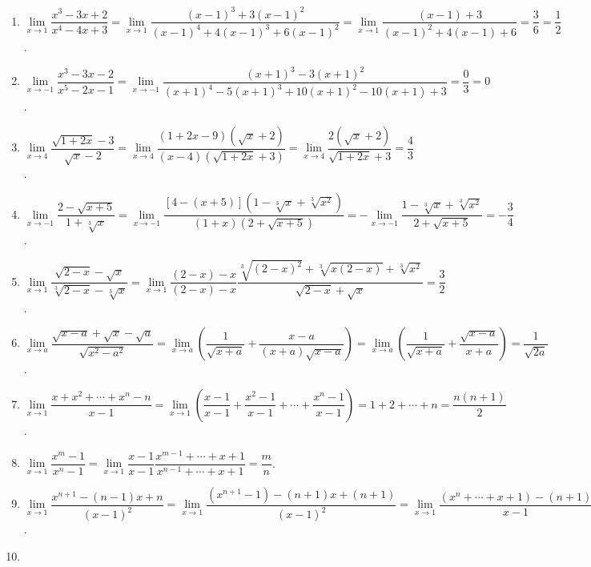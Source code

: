 \documentclass[UTF8,a4paper,20pt]{article}
\begin{document}
\begin{enumerate}[1.]
\begin{enumerate}[(1)]
	\item $\lim\limits_{x\to 1} \dfrac{x^3-3x+2}{x^4-4x+3}=\lim\limits_{x\to 1} \dfrac{(x-1)^3+3(x-1)^2}{(x-1)^4+4(x-1)^3+6(x-1)^2}=\lim\limits_{x\to 1} \dfrac{(x-1)+3}{(x-1)^2+4(x-1)+6}=\dfrac{3}{6}=\dfrac{1}{2}$.
	\item $\lim\limits_{x\to -1} \dfrac{x^3-3x-2}{x^5-2x-1}=\lim\limits_{x\to -1} \dfrac{(x+1)^3-3(x+1)^2}{(x+1)^4-5(x+1)^3+10(x+1)^2-10(x+1)+3}=\dfrac{0}{3}=0$.
	\item $\lim\limits_{x\to 4} \dfrac{\sqrt{1+2x}-3}{\sqrt{x}-2}=\lim\limits_{x\to 4} \dfrac{(1+2x-9)(\sqrt{x}+2)}{(x-4)(\sqrt{1+2x}+3)}=\lim\limits_{x\to 4} \dfrac{2(\sqrt{x}+2)}{\sqrt{1+2x}+3}=\dfrac{4}{3}$.
	\item $\lim\limits_{x\to -1} \dfrac{2-\sqrt{x+5}}{1+\sqrt[3]{x}}=\lim\limits_{x\to -1} \dfrac{[4-(x+5)](1-\sqrt[3]{x}+\sqrt[3]{x^2})}{(1+x)(2+\sqrt{x+5})}=-\lim\limits_{x\to -1} \dfrac{1-\sqrt[3]{x}+\sqrt[3]{x^2}}{2+\sqrt{x+5}}= -\dfrac{3}{4}$.
	\item $\lim\limits_{x\to 1} \dfrac{\sqrt{2-x}-\sqrt{x}}{\sqrt[3]{2-x}-\sqrt[3]{x}}=\lim\limits_{x\to 1} \dfrac{(2-x)-x}{(2-x)-x}\dfrac{\sqrt[3]{(2-x)^2}+\sqrt[3]{x(2-x)}+\sqrt[3]{x^2}}{\sqrt{2-x}+\sqrt{x}}=\dfrac{3}{2}$.
	\item $\lim\limits_{x\to a} \dfrac{\sqrt{x-a}+\sqrt{x}-\sqrt{a}}{\sqrt{x^2-a^2}}=\lim\limits_{x\to a}\left(\dfrac{1}{\sqrt{x+a}}+\dfrac{x-a}{(x+a)\sqrt{x-a}}\right)=\lim\limits_{x\to a}\left(\dfrac{1}{\sqrt{x+a}}+\dfrac{\sqrt{x-a}}{x+a}\right)=\dfrac{1}{\sqrt{2a}}$.
	\item $\lim\limits_{x\to 1} \dfrac{x+x^2+\cdots+x^n-n}{x-1}=\lim\limits_{x\to 1}\left(\dfrac{x-1}{x-1}+\dfrac{x^2-1}{x-1}+\cdots+\dfrac{x^n-1}{x-1}\right)=1+2+\cdots+n=\dfrac{n(n+1)}{2}$.
	\item $\lim\limits_{x\to 1} \dfrac{x^m-1}{x^n-1}=\lim\limits_{x\to 1}\dfrac{x-1}{x-1}\dfrac{x^{m-1}+\cdots+x+1}{x^{n-1}+\cdots+x+1}=\dfrac{m}{n}$.
	\item $\lim\limits_{x\to 1} \dfrac{x^{n+1}-(n-1)x+n}{(x-1)^2}=\lim\limits_{x\to 1} \dfrac{(x^{n+1}-1)-(n+1)x+(n+1)}{(x-1)^2} =\lim\limits_{x\to 1} \dfrac{(x^n+\cdots+x+1)-(n+1)}{x-1}=\lim\limits_{x\to 1} \dfrac{(x^n+\cdots+x^2+x)-n}{x-1}=\dfrac{n(n+1)}{2}$.
	\item 
	\end{enumerate}


\end{enumerate}
\end{document}

